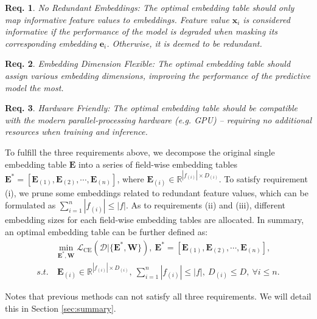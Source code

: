 \documentclass[sigconf]{acmart}
\newtheorem{myDef}{Req.}
\begin{document}
\begin{myDef}
\label{def:r1}
\emph{No Redundant Embeddings}: The optimal embedding table should only map informative feature values to embeddings. Feature value $\mathbf{x}_i$ is considered informative if the performance of the model is degraded when masking its corresponding embedding $\mathbf{e}_i$. Otherwise, it is deemed to be redundant. 
\end{myDef}

\begin{myDef}
\label{def:r2} \emph{Embedding Dimension Flexible}: The optimal embedding table should assign various embedding dimensions, improving the performance of the predictive model the most.
\end{myDef}

\begin{myDef}
\label{def:r3} \emph{Hardware Friendly}: The optimal embedding table should be compatible with the modern parallel-processing hardware (e.g. GPU) -- requiring no additional resources when training and inference.

\end{myDef}

To fulfill the three requirements above, we decompose the original single embedding table $\mathbf{E}$ into a series of field-wise embedding tables $\mathbf{E}^{*} = [\mathbf{E}_{(1)}, \mathbf{E}_{(2)}, \cdots, \mathbf{E}_{(n)}]$, where $\mathbf{E}_{(i)} \in \mathbb{R}^{|f_{(i)}| \times D_{(i)}}$. To satisfy requirement (i), we prune some embeddings related to redundant feature values, which can be formulated as $\sum_{i=1}^n |f_{(i)}| \le |f|$. As to requirements (ii) and (iii), different embedding sizes for each field-wise embedding tables are allocated. In summary, an optimal embedding table can be further defined as:
\begin{equation}
\label{eq:summarize2}
\begin{aligned}
    & \min_{\mathbf{E}^*, \mathbf{W}} \mathcal{L}_{\text{CE}}(\mathcal{D}|\{\mathbf{E}^{*}, \mathbf{W}\}), \ \mathbf{E}^{*} = [\mathbf{E}_{(1)}, \mathbf{E}_{(2)}, \cdots, \mathbf{E}_{(n)}], \\
    s.t. & \ \mathbf{E}_{(i)} \in \mathbb{R}^{|f_{(i)}| \times D_{(i)}}, \ \sum_{i=1}^n |f_{(i)}| \le |f|, \ D_{(i)} \le D, \ \forall i \le n.
\end{aligned}
\end{equation}

Notes that previous methods can not satisfy all three requirements. We will detail this in Section \ref{sec:summary}.
\end{document}

